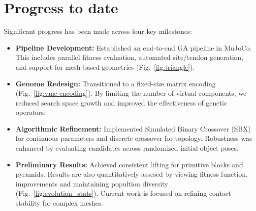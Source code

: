 \documentclass[12pt,a4paper,twocolumn]{article}
\begin{document}
\section{Progress to date}
Significant progress has been made across four key milestones:
\begin{itemize}
    \item \textbf{Pipeline Development:} Established an end-to-end GA pipeline in MuJoCo. This includes parallel fitness evaluation, automated site/tendon generation, and support for mesh-based geometries (Fig.~\ref{fig:triangle}).
    \item \textbf{Genome Redesign:} Transitioned to a fixed-size matrix encoding (Fig.~\ref{fig:vmc-encoding}). By limiting the number of virtual components, we reduced search space growth and improved the effectiveness of genetic operators.
    \item \textbf{Algorithmic Refinement:} Implemented Simulated Binary Crossover (SBX) for continuous parameters and discrete crossover for topology. Robustness was enhanced by evaluating candidates across randomized initial object poses.
    \item \textbf{Preliminary Results:} Achieved consistent lifting for primitive blocks and pyramids. Results are also quantitatively assesed by viewing fitness function, improvements and maintaining popultion diversity (Fig.~\ref{fig:evolution_stats}). Current work is focused on refining contact stability for complex meshes.
\end{itemize}

\end{document}
